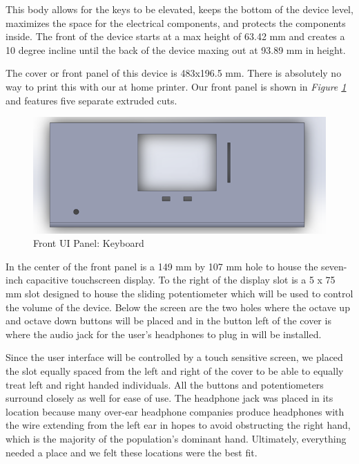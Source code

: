This body allows for the keys to be elevated, keeps the bottom of the device level, maximizes the space for the electrical components, and protects the components inside. The front of the device starts at a max height of 63.42 mm and creates a 10 degree incline until the back of the device maxing out at 93.89 mm in height.

The cover or front panel of this device is 483x196.5 mm. There is absolutely no way to print this with our at home printer. Our front panel is shown in \textit{Figure \ref{fig:display_model}} and features five separate extruded cuts.

\begin{figure}[h!]
  \centering
  \includegraphics[width=0.9\linewidth]{image/DisplayModel.png}
  \caption{Front UI Panel: Keyboard}
  \label{fig:display_model}
\end{figure}

In the center of the front panel is a 149 mm by 107 mm hole to house the seven-inch capacitive touchscreen display. To the right of the display slot is a 5 x 75 mm slot designed to house the sliding potentiometer which will be used to control the volume of the device. Below the screen are the two holes where the octave up and octave down buttons will be placed and in the button left of the cover is where the audio jack for the user’s headphones to plug in will be installed.

Since the user interface will be controlled by a touch sensitive screen, we placed the slot equally spaced from the left and right of the cover to be able to equally treat left and right handed individuals. All the buttons and potentiometers surround closely as well for ease of use. The headphone jack was placed in its location because many over-ear headphone companies produce headphones with the wire extending from the left ear in hopes to avoid obstructing the right hand, which is the majority of the population’s dominant hand. Ultimately, everything needed a place and we felt these locations were the best fit.

